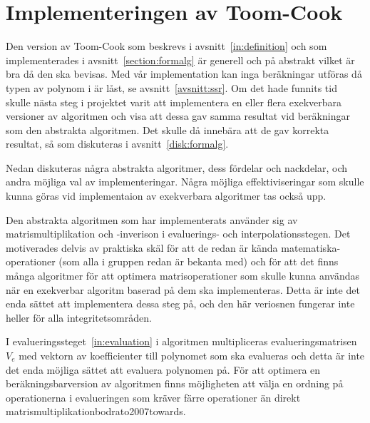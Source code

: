 \section{Implementeringen av Toom-Cook}
Den version av Toom-Cook som beskrevs i avsnitt~\ref{in:definition} och som
implementerades i avsnitt~\ref{section:formalg} är generell och på abstrakt
vilket är bra då den ska bevisas. Med vår implementation kan inga beräkningar
utföras då typen av polynom i \ssr{} är låst, se avsnitt~\ref{avsnitt:ssr}. Om
det hade funnits tid skulle nästa steg i projektet varit att implementera en
eller flera exekverbara versioner av algoritmen och visa att dessa gav samma
resultat vid beräkningar som den abstrakta algoritmen. Det skulle då innebära
att de gav korrekta resultat, så som diskuteras i avsnitt~\ref{disk:formalg}.

Nedan diskuteras några abstrakta algoritmer, dess fördelar och nackdelar, och
andra möjliga val av implementeringar. Några möjliga effektiviseringar som
skulle kunna göras vid implementaion av exekverbara algoritmer tas också upp.

Den abstrakta algoritmen som har implementerats använder sig av
matrismultiplikation och -inverison i evaluerings- och interpolationsstegen.
Det motiverades delvis av praktiska skäl för att de redan är kända
matematiska-operationer (som alla i gruppen redan är bekanta med) och för att
det finns många algoritmer för att optimera matrisoperationer som skulle kunna
användas när en exekverbar algoritm baserad på dem ska implementeras. Detta är
inte det enda sättet att implementera dessa steg på, och den här veriosnen
fungerar inte heller för alla integritetsområden.



I evalueringssteget~\ref{in:evaluation} i algoritmen multipliceras
evalueringsmatrisen $V_e$ med vektorn av koefficienter till polynomet som ska
evalueras och detta är inte det enda möjliga sättet att evaluera polynomen på.
För att optimera en beräkningsbarversion av algoritmen finns möjligheten att
välja en ordning på operationerna i evalueringen som kräver färre operationer
än direkt matrismultiplikation{bodrato2007towards}.

